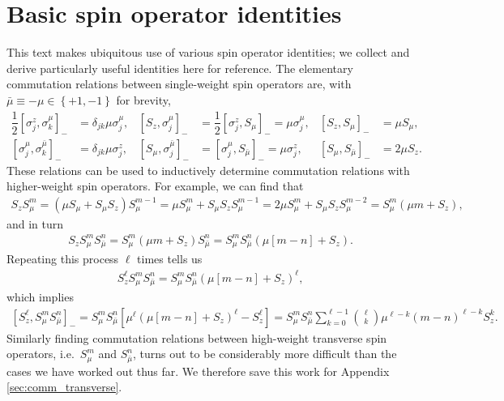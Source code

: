 \documentclass[aps,notitlepage,nofootinbib,11pt]{revtex4-1}
\newcommand{\f}[2]{\dfrac{#1}{#2}} %
\newcommand{\p}[1]{\left(#1\right)} %
\renewcommand{\sp}[1]{\left[#1\right]} %
\renewcommand{\set}[1]{\left\{#1\right\}} %
\newcommand{\bmu}{{\bar\mu}}
\newcommand{\1}{\mathds{1}}
\begin{document}


\newpage
\appendix

\section{Basic spin operator identities}
\label{sec:identities}

This text makes ubiquitous use of various spin operator identities; we
collect and derive particularly useful identities here for reference.
The elementary commutation relations between single-weight spin
operators are, with $\bmu\equiv-\mu\in\set{+1,-1}$ for brevity,
\begin{align}
  \f12 \sp{\sigma_j^z,\sigma_k^\mu}_-
  &= \delta_{jk} \mu \sigma_j^\mu,
  &
  \sp{S_z,\sigma_j^\mu}_-
  &= \f12 \sp{\sigma_j^z,S_\mu}_- = \mu \sigma_j^\mu,
  &
  \sp{S_z,S_\mu}_-
  &= \mu S_\mu,
  \label{eq:comm_z_mu_base} \\
  \sp{\sigma_j^\mu,\sigma_k^\bmu}_-
  &= \delta_{jk} \mu \sigma_j^z,
  &
  \sp{S_\mu,\sigma_j^\bmu}_-
  &= \sp{\sigma_j^\mu,S_\bmu}_- = \mu \sigma_j^z,
  &
  \sp{S_\mu,S_\bmu}_-
  &= 2 \mu S_z.
  \label{eq:comm_mu_base}
\end{align}
These relations can be used to inductively determine commutation
relations with higher-weight spin operators.  For example, we can find
that
\begin{align}
  S_z S_\mu^m
  = \p{\mu S_\mu + S_\mu S_z} S_\mu^{m-1}
  = \mu S_\mu^m + S_\mu S_z S_\mu^{m-1}
  = 2 \mu S_\mu^m + S_\mu S_z S_\mu^{m-2}
  = S_\mu^m \p{\mu m + S_z},
  \label{eq:push_z_mu_single}
\end{align}
and in turn
\begin{align}
  S_z S_\mu^m S_\bmu^n
  = S_\mu^m \p{\mu m + S_z} S_\bmu^n
  = S_\mu^m S_\bmu^n \p{\mu\sp{m - n} + S_z}.
\end{align}
Repeating this process $\ell$ times tells us
\begin{align}
  S_z^\ell S_\mu^m S_\bmu^n
  = S_\mu^m S_\bmu^n \p{\mu\sp{m - n} + S_z}^\ell,
  \label{eq:push_z_mu}
\end{align}
which implies
\begin{align}
  \sp{S_z^\ell, S_\mu^m S_\bmu^n}_-
  = S_\mu^m S_\bmu^n \sp{\mu^\ell \p{\mu\sp{m - n} + S_z}^\ell - S_z^\ell}
  = S_\mu^m S_\bmu^n  \sum_{k=0}^{\ell-1} {\ell \choose k}
  \mu^{\ell-k} \p{m-n}^{\ell-k} S_z^k.
  \label{eq:comm_z_mu}
\end{align}
Similarly finding commutation relations between high-weight transverse
spin operators, i.e.~$S_\mu^m$ and $S_\bmu^n$, turns out to be
considerably more difficult than the cases we have worked out thus
far.  We therefore save this work for Appendix
\ref{sec:comm_transverse}.
\end{document}
